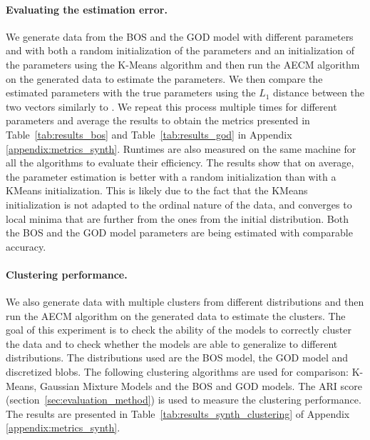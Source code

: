 \paragraph{Evaluating the estimation error.}
We generate data from the BOS and the GOD model with different parameters and with both a random initialization of the parameters and an initialization of the parameters using the K-Means algorithm and then run the AECM algorithm on the generated data to estimate the parameters. We then compare the estimated parameters with the true parameters using the $L_1$ distance between the two vectors similarly to \cite{biernacki2016model}. We repeat this process multiple times for different parameters and average the results to obtain the metrics presented in Table~\ref{tab:results_bos} and Table~\ref{tab:results_god} in Appendix \ref{appendix:metrics_synth}. Runtimes are also measured on the same machine for all the algorithms to evaluate their efficiency.
The results show that on average, the parameter estimation is better with a random initialization than with a KMeans initialization. This is likely due to the fact that the KMeans initialization is not adapted to the ordinal nature of the data, and converges to local minima that are further from the ones from the initial distribution. Both the BOS and the GOD model parameters are being estimated with comparable accuracy.

\paragraph{Clustering performance.}
We also generate data with multiple clusters from different distributions and then run the AECM algorithm on the generated data to estimate the clusters. The goal of this experiment is to check the ability of the models to correctly cluster the data and to check whether the models are able to generalize to different distributions.
The distributions used are the BOS model, the GOD model and discretized blobs.
The following clustering algorithms are used for comparison: K-Means, Gaussian Mixture Models and the BOS and GOD models. The ARI score (section~\ref{sec:evaluation_method}) is used to measure the clustering performance. The results are presented in Table~\ref{tab:results_synth_clustering} of Appendix \ref{appendix:metrics_synth}.

